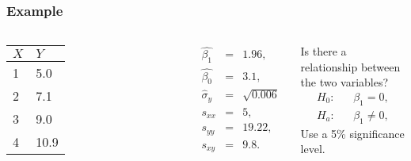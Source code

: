 \begin{frame}
  \frametitle{Example}

    \begin{columns}

      \begin{tabular}{l|l}
        $X$ & $Y$ \\ \hline
        1 & 5.0 \\
        2 & 7.1 \\
        3 & 9.0 \\
        4 & 10.9 \\
      \end{tabular}


      \begin{eqnarray*}
        \hat{\beta_1} & = & 1.96, \\
        \hat{\beta_0} & = & 3.1, \\
        \hat{\sigma}_y & = & \sqrt{0.006} \\
        s_{xx} & = & 5, \\
        s_{yy} & = & 19.22, \\
        s_{xy} & = & 9.8. 
      \end{eqnarray*}



      Is there a relationship between the two variables?
      \begin{eqnarray*}
        H_0: & & \beta_1=0, \\
        H_a: & & \beta_1\neq 0,        
      \end{eqnarray*}
      Use a 5\% significance level.

    \end{columns}


\end{frame}


